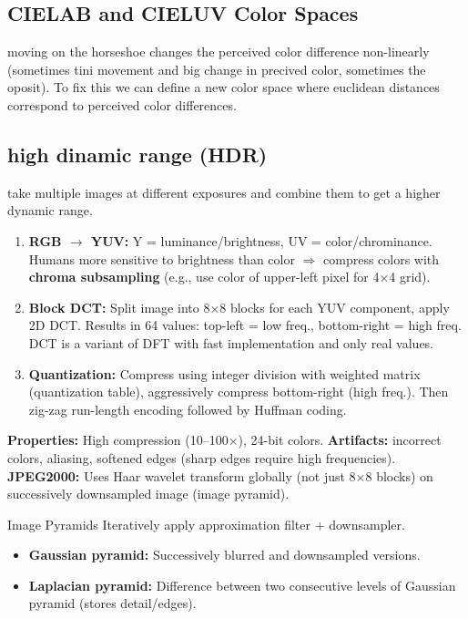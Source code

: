 \documentclass[a4paper,9pt]{article}
\begin{document}
\subsection{CIELAB and CIELUV Color Spaces}
moving on the horseshoe changes the perceived color difference non-linearly (sometimes tini movement and big change in precived color, sometimes the oposit). To fix this we can define a new color space where euclidean distances correspond to perceived color differences. 
\subsection{high dinamic range (HDR)}
take multiple images at different exposures and combine them to get a higher dynamic range.
\begin{enumerate}
    \item \textbf{RGB $\to$ YUV:} Y = luminance/brightness, UV = color/chrominance. Humans more sensitive to brightness than color $\Rightarrow$ compress colors with \textbf{chroma subsampling} (e.g., use color of upper-left pixel for 4×4 grid).
    \item \textbf{Block DCT:} Split image into 8×8 blocks for each YUV component, apply 2D DCT. Results in 64 values: top-left = low freq., bottom-right = high freq. DCT is a variant of DFT with fast implementation and only real values.
    \item \textbf{Quantization: } Compress using integer division with weighted matrix (quantization table), aggressively compress bottom-right (high freq.). Then zig-zag run-length encoding followed by Huffman coding.
\end{enumerate}
\textbf{Properties:} High compression (10–100×), 24-bit colors. \textbf{Artifacts:} incorrect colors, aliasing, softened edges (sharp edges require high frequencies).\\
\textbf{JPEG2000:} Uses Haar wavelet transform globally (not just 8×8 blocks) on successively downsampled image (image pyramid).

\begin{subbox}{Image Pyramids}
Iteratively apply approximation filter + downsampler.
\begin{itemize}
    \item \textbf{Gaussian pyramid:} Successively blurred and downsampled versions.
    \item \textbf{Laplacian pyramid:} Difference between two consecutive levels of Gaussian pyramid (stores detail/edges).
\end{itemize}
\end{subbox}
\end{document}
